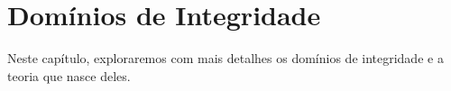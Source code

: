 \chapter{Domínios de Integridade}
Neste capítulo, exploraremos com mais detalhes os domínios de integridade e a teoria que nasce deles.